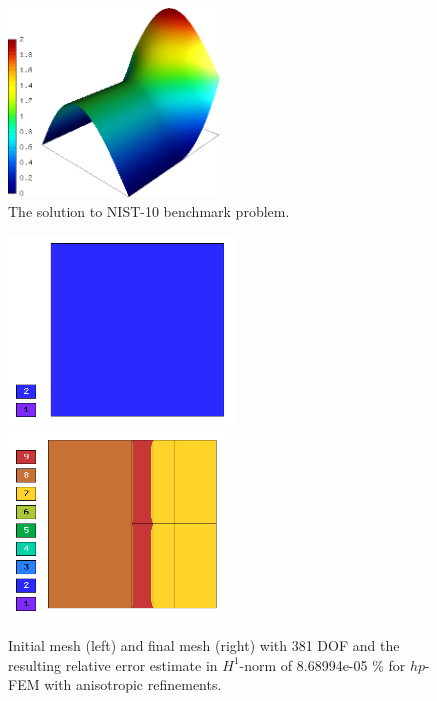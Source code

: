 \documentclass[12pt]{elsarticle}
\begin{document}
\begin{figure}[!ht]
\centering
\includegraphics[height=5cm]{nist/nist-10/solution.png}
\caption{The solution to NIST-10 benchmark problem.}
\label{fig:sln-nist10}
\end{figure}

\begin{figure}[!ht]
\centering
\includegraphics[height=5cm]{nist/nist-10/mesh_hp_aniso_init.png}\ \
\includegraphics[height=5cm]{nist/nist-10/mesh_hp_aniso.png}
\caption{Initial mesh (left) and final mesh (right) with 381 DOF and the resulting relative error estimate in $H^1$-norm of 8.68994e-05 \% for $hp$-FEM with anisotropic refinements.}
\label{fig:nist-10-hp-aniso}
\end{figure}
\end{document}
